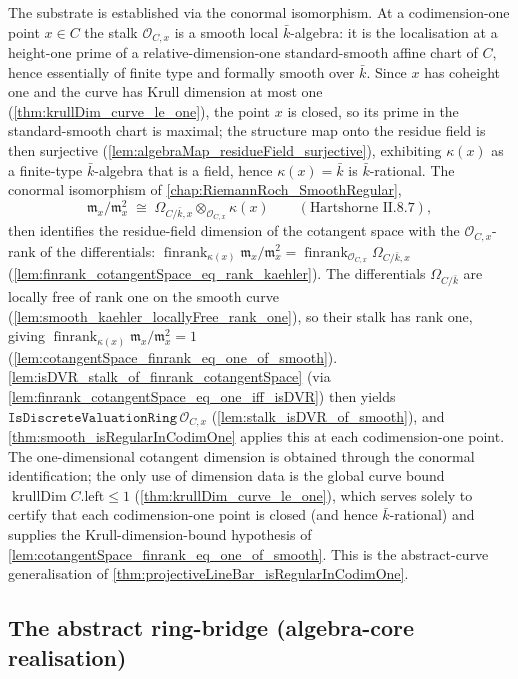 The substrate is established via the conormal isomorphism. At a codimension-one point \(x \in C\) the stalk \(\mathcal O_{C, x}\)
is a smooth local \(\bar k\)-algebra: it is the localisation at a height-one
prime of a relative-dimension-one standard-smooth affine chart of \(C\), hence
essentially of finite type and formally smooth over \(\bar k\). Since \(x\) has
coheight one and the curve has Krull dimension at most one
(\cref{thm:krullDim_curve_le_one}), the point \(x\) is closed, so its prime in
the standard-smooth chart is maximal; the structure map onto the residue field
is then surjective (\cref{lem:algebraMap_residueField_surjective}), exhibiting
\(\kappa(x)\) as a finite-type \(\bar k\)-algebra that is a field, hence
\(\kappa(x) = \bar k\) is \(\bar k\)-rational. The conormal isomorphism of
\cref{chap:RiemannRoch_SmoothRegular},
\[
  \mathfrak m_x / \mathfrak m_x^2 \;\cong\;
  \Omega_{C/\bar k, x} \otimes_{\mathcal O_{C, x}} \kappa(x)
  \qquad (\text{Hartshorne~II.8.7}),
\]
then identifies the residue-field dimension of the cotangent space with the
\(\mathcal O_{C, x}\)-rank of the differentials:
\(\operatorname{finrank}_{\kappa(x)} \mathfrak m_x / \mathfrak m_x^2
= \operatorname{finrank}_{\mathcal O_{C, x}} \Omega_{C/\bar k, x}\)
(\cref{lem:finrank_cotangentSpace_eq_rank_kaehler}). The differentials
\(\Omega_{C/\bar k}\) are locally free of rank one on the smooth curve
(\cref{lem:smooth_kaehler_locallyFree_rank_one}), so their stalk has rank one,
giving
\(\operatorname{finrank}_{\kappa(x)} \mathfrak m_x / \mathfrak m_x^2 = 1\)
(\cref{lem:cotangentSpace_finrank_eq_one_of_smooth}).
\cref{lem:isDVR_stalk_of_finrank_cotangentSpace} (via
\cref{lem:finrank_cotangentSpace_eq_one_iff_isDVR}) then yields
\(\texttt{IsDiscreteValuationRing}\,\mathcal O_{C, x}\)
(\cref{lem:stalk_isDVR_of_smooth}), and
\cref{thm:smooth_isRegularInCodimOne} applies this at each
codimension-one point. The one-dimensional cotangent dimension is obtained
through the conormal identification; the only use of dimension data is the
global curve bound \(\operatorname{krullDim} C.\mathrm{left} \le 1\)
(\cref{thm:krullDim_curve_le_one}), which serves solely to certify that each
codimension-one point is closed (and hence \(\bar k\)-rational) and supplies the
Krull-dimension-bound hypothesis of \cref{lem:cotangentSpace_finrank_eq_one_of_smooth}.
This is the abstract-curve generalisation of
\cref{thm:projectiveLineBar_isRegularInCodimOne}.

\subsection{The abstract ring-bridge (algebra-core realisation)}

